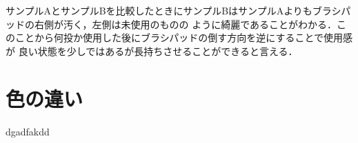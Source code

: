 \documentclass[main]{subfiles}
\begin{document}
サンプルAとサンプルBを比較したときにサンプルBはサンプルAよりもブラシパッドの右側が汚く，左側は未使用のものの
ように綺麗であることがわかる．このことから何投か使用した後にブラシパッドの倒す方向を逆にすることで使用感が
良い状態を少しではあるが長持ちさせることができると言える．
\\

\section{色の違い}

dgadfakdd
\end{document}
